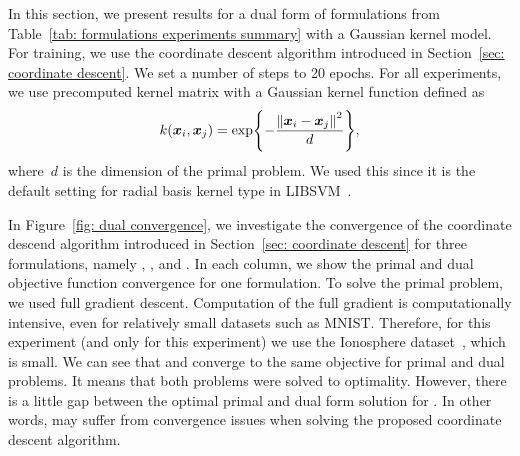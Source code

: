 In this section, we present results for a dual form of formulations from Table~\ref{tab: formulations experiments summary} with a Gaussian kernel model. For training, we use the coordinate descent algorithm introduced in Section~\ref{sec: coordinate descent}. We set a number of steps to 20 epochs. For all experiments, we use precomputed kernel matrix with a Gaussian kernel function defined as 
\begin{equation*}
  k(\bm{x}_i, \bm{x}_j) = \exp\Brac[c]{- \frac{\norm{\bm{x}_i - \bm{x}_j}^2}{d}},
\end{equation*}
where~$d$ is the dimension of the primal problem. We used this since it is the default setting for radial basis kernel type in LIBSVM~\cite{chang2011libsvm}.

In Figure~\ref{fig: dual convergence}, we investigate the convergence of the coordinate descend algorithm introduced in Section~\ref{sec: coordinate descent} for three formulations, namely \TopPush, \TopPushK, and \PatMatNP. In each column, we show the primal and dual objective function convergence for one formulation. To solve the primal problem, we used full gradient descent. Computation of the full gradient is computationally intensive, even for relatively small datasets such as MNIST. Therefore, for this experiment (and only for this experiment) we use the Ionosphere dataset~\cite{sigillito1989classification}, which is small. We can see that \TopPush and \TopPushK converge to the same objective for primal and dual problems. It means that both problems were solved to optimality. However, there is a little gap between the optimal primal and dual form solution for \PatMatNP. In other words, \PatMatNP may suffer from convergence issues when solving the proposed coordinate descent algorithm.  


